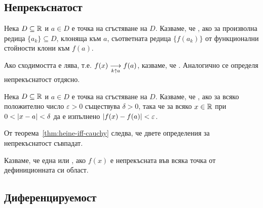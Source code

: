 \documentclass[numbers=endperiod, bibliography=totocnumbered]{scrartcl}
\begin{document}
\subsection{Непрекъснатост}

\begin{definition}
  Нека \( D \subseteq \R \) и \( a \in D \) е точка на сгъстяване на \( D \). Казваме, че , ако за произволна редица \( \{ a_k \} \subseteq D \), клоняща към \( a \), съответната редица \( \{ f(a_k) \} \) от функционални стойности клони към \( f(a) \).

  Ако сходимостта е лява, т.е. \( f(x) \Conv[k \uparrow a]{} f(a) \), казваме, че . Аналогично се определя непрекъснатост отдясно.
\end{definition}

\begin{definition}
  Нека \( D \subseteq \R \) и \( a \in D \) е точка на сгъстяване на \( D \). Казваме, че , ако за всяко положително число \( \varepsilon > 0 \) съществува \( \delta > 0 \), така че за всяко \( x \in \R \) при \( 0 < \Abs{x - a} < \delta \) да е изпълнено \( \Abs{f(x) - f(a)} < \varepsilon \).
\end{definition}

\begin{note}
  От теорема~\ref{thm:heine-iff-cauchy} следва, че двете определения за непрекъснатост съвпадат.
\end{note}

\begin{definition}
  Казваме, че една  или , ако \( f(x) \) е непрекъсната във всяка точка от дефиниционната си област.
\end{definition}

\subsection{Диференцируемост}
\end{document}
